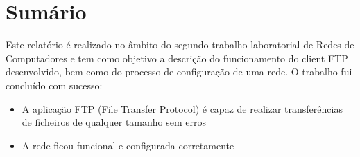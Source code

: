 \section{Sumário}


Este relatório é realizado no âmbito do segundo trabalho laboratorial de Redes de Computadores e tem como objetivo a descrição do funcionamento do client FTP desenvolvido, bem como do processo de configuração de uma rede. O trabalho fui concluído com sucesso:
\begin{itemize}
    \item A aplicação FTP (File Transfer Protocol) é capaz de realizar transferências de ficheiros de qualquer tamanho sem erros
    \item A rede ficou funcional e configurada corretamente
\end{itemize}

